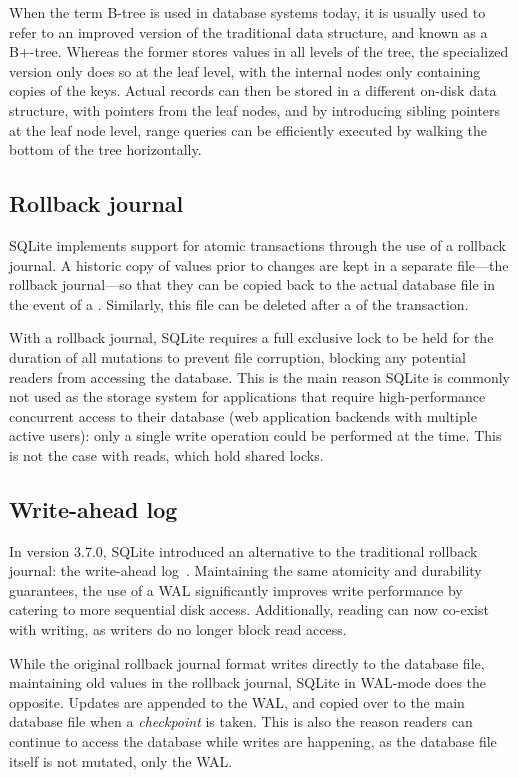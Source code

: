 When the term B-tree is used in database systems today, it is usually used to
refer to an improved version of the traditional data structure, and known as a
B+-tree. Whereas the former stores values in all levels of the tree, the
specialized version only does so at the leaf level, with the internal nodes only
containing copies of the keys. Actual records can then be stored in a different
on-disk data structure, with pointers from the leaf nodes, and by introducing
sibling pointers at the leaf node level, range queries can be efficiently
executed by walking the bottom of the tree horizontally.

\subsection{Rollback journal}\label{sec:sqlite-locks}
SQLite implements support for atomic transactions through the use of a rollback
journal. A historic copy of values prior to changes are kept in a separate
file---the rollback journal---so that they can be copied back to the actual
database file in the event of a . Similarly, this file can be
deleted after a  of the transaction.

With a rollback journal, SQLite requires a full exclusive lock to be held for
the duration of all mutations to prevent file corruption, blocking any potential
readers from accessing the database. This is the main reason SQLite is commonly
not used as the storage system for applications that require high-performance
concurrent access to their database (\eg web application backends with multiple
active users): only a single write operation could be performed at the time.
This is not the case with reads, which hold shared locks.

\subsection{Write-ahead log}\label{sec:sqlite-wal}
In version 3.7.0, SQLite introduced an alternative to the traditional rollback
journal: the write-ahead log~\cite{sqlite-wal}. Maintaining the same atomicity
and durability guarantees, the use of a WAL significantly improves write
performance by catering to more sequential disk access. Additionally, reading
can now co-exist with writing, as writers do no longer block read access.

While the original rollback journal format writes directly to the database file,
maintaining old values in the rollback journal, SQLite in WAL-mode does the
opposite. Updates are appended to the WAL, and copied over to the main database
file when a \textit{checkpoint} is taken. This is also the reason readers can
continue to access the database while writes are happening, as the database file
itself is not mutated, only the WAL.\@

